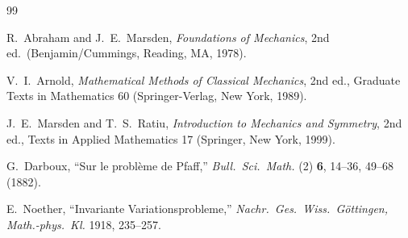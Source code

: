 \begin{thebibliography}{99}

R.~Abraham and J.~E.~Marsden, \emph{Foundations of Mechanics}, 2nd
  ed.\ (Benjamin/Cummings, Reading, MA, 1978).

V.~I.~Arnold, \emph{Mathematical Methods of Classical Mechanics}, 2nd
  ed., Graduate Texts in Mathematics 60 (Springer-Verlag, New York,
  1989).

J.~E.~Marsden and T.~S.~Ratiu, \emph{Introduction to Mechanics and
  Symmetry}, 2nd ed., Texts in Applied Mathematics 17 (Springer, New
  York, 1999).

G.~Darboux, ``Sur le probl\`eme de Pfaff,'' \emph{Bull.\ Sci.\ Math.}
  (2) \textbf{6}, 14--36, 49--68 (1882).

E.~Noether, ``Invariante Variationsprobleme,'' \emph{Nachr.\ Ges.\
  Wiss.\ G\"ottingen, Math.-phys.\ Kl.} 1918, 235--257.

\end{thebibliography}
